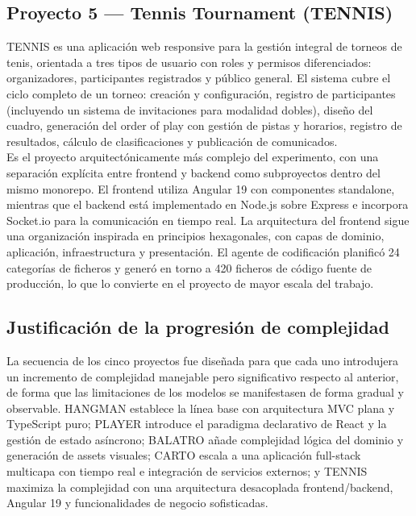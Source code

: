 \subsection{Proyecto 5 — Tennis Tournament (\ac{TENNIS})} \label{subsec:p5-tennis}

\ac{TENNIS} es una aplicación web responsive para la gestión integral de torneos de tenis, orientada a tres tipos de usuario con roles y permisos diferenciados: organizadores, participantes registrados y público general.
El sistema cubre el ciclo completo de un torneo: creación y configuración, registro de participantes (incluyendo un sistema de invitaciones para modalidad dobles), diseño del cuadro, generación del order of play con gestión de pistas y horarios, registro de resultados, cálculo de clasificaciones y publicación de comunicados.\\

Es el proyecto arquitectónicamente más complejo del experimento, con una separación explícita entre frontend y backend como subproyectos dentro del mismo monorepo.
El frontend utiliza Angular 19 con componentes standalone, mientras que el backend está implementado en Node.js sobre Express e incorpora Socket.io para la comunicación en tiempo real.
La arquitectura del frontend sigue una organización inspirada en principios hexagonales, con capas de dominio, aplicación, infraestructura y presentación.
El agente de codificación planificó 24 categorías de ficheros y generó en torno a 420 ficheros de código fuente de producción, lo que lo convierte en el proyecto de mayor escala del trabajo.\\

\subsection{Justificación de la progresión de complejidad} \label{subsec:justificacion-progresion}

La secuencia de los cinco proyectos fue diseñada para que cada uno introdujera un incremento de complejidad manejable pero significativo respecto al anterior, de forma que las limitaciones de los modelos se manifestasen de forma gradual y observable.
\ac{HANGMAN} establece la línea base con arquitectura \ac{MVC} plana y TypeScript puro; \ac{PLAYER} introduce el paradigma declarativo de React y la gestión de estado asíncrono; \ac{BALATRO} añade complejidad lógica del dominio y generación de assets visuales; \ac{CARTO} escala a una aplicación full-stack multicapa con tiempo real e integración de servicios externos; y \ac{TENNIS} maximiza la complejidad con una arquitectura desacoplada frontend/backend, Angular 19 y funcionalidades de negocio sofisticadas.\\

